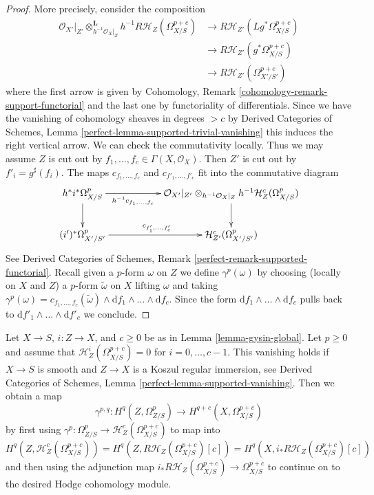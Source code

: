 \begin{proof}
More precisely, consider the composition
\begin{align*}
\mathcal{O}_{X'}|_{Z'} \otimes_{h^{-1}\mathcal{O}_X|_Z}^\mathbf{L}
h^{-1}R\mathcal{H}_Z(\Omega^{p + c}_{X/S})
& \to
R\mathcal{H}_{Z'}(Lg^*\Omega^{p + c}_{X/S}) \\
& \to
R\mathcal{H}_{Z'}(g^*\Omega^{p + c}_{X/S}) \\
& \to
R\mathcal{H}_{Z'}(\Omega^{p + c}_{X'/S'})
\end{align*}
where the first arrow is given by
Cohomology, Remark \ref{cohomology-remark-support-functorial}
and the last one by functoriality of differentials.
Since we have the vanishing of cohomology sheaves in degrees $> c$
by Derived Categories of Schemes, Lemma
\ref{perfect-lemma-supported-trivial-vanishing}
this induces the right vertical arrow.
We can check the commutativity locally.
Thus we may assume $Z$ is cut out by
$f_1, \ldots, f_c \in \Gamma(X, \mathcal{O}_X)$.
Then $Z'$ is cut out by $f'_i = g^\sharp(f_i)$.
The maps $c_{f_1, \ldots, f_c}$ and $c_{f'_1, \ldots, f'_c}$
fit into the commutative diagram
$$
\xymatrix{
h^*i^*\Omega^p_{X/S} \ar[rr]_-{h^{-1}c_{f_1, \ldots, f_c}} \ar[d] & &
\mathcal{O}_{X'}|_{Z'} \otimes_{h^{-1}\mathcal{O}_X|_Z}
h^{-1}\mathcal{H}^c_Z(\Omega^p_{X/S}) \ar[d] \\
(i')^*\Omega^p_{X'/S'} \ar[rr]^{c_{f'_1, \ldots, f'_c}} & &
\mathcal{H}^c_{Z'}(\Omega^p_{X'/S'})
}
$$
See Derived Categories of Schemes, Remark
\ref{perfect-remark-supported-functorial}.
Recall given a $p$-form $\omega$ on $Z$ we define
$\gamma^p(\omega)$ by choosing (locally on $X$ and $Z$)
a $p$-form $\tilde \omega$ on $X$ lifting $\omega$ and taking
$\gamma^p(\omega) =
c_{f_1, \ldots, f_c}(\tilde \omega) \wedge
\text{d}f_1 \wedge \ldots \wedge \text{d}f_c$.
Since the form $\text{d}f_1 \wedge \ldots \wedge \text{d}f_c$
pulls back to
$\text{d}f'_1 \wedge \ldots \wedge \text{d}f'_c$ we conclude.
\end{proof}

\begin{remark}
\label{remark-how-to-use}
Let $X \to S$, $i : Z \to X$, and $c \geq 0$ be as in
Lemma \ref{lemma-gysin-global}.
Let $p \geq 0$ and assume that $\mathcal{H}^i_Z(\Omega^{p + c}_{X/S}) = 0$
for $i = 0, \ldots, c - 1$. This vanishing holds if $X \to S$ is smooth
and $Z \to X$ is a Koszul regular immersion, see
Derived Categories of Schemes, Lemma \ref{perfect-lemma-supported-vanishing}.
Then we obtain a map
$$
\gamma^{p, q} :
H^q(Z, \Omega^p_{Z/S})
\longrightarrow
H^{q + c}(X, \Omega^{p + c}_{X/S})
$$
by first using
$\gamma^p : \Omega^p_{Z/S} \to \mathcal{H}^c_Z(\Omega^{p + c}_{X/S})$
to map into
$$
H^q(Z, \mathcal{H}^c_Z(\Omega^{p + c}_{X/S})) =
H^q(Z, R\mathcal{H}_Z(\Omega^{p + c}_{X/S})[c]) =
H^q(X, i_*R\mathcal{H}_Z(\Omega^{p + c}_{X/S})[c])
$$
and then using the adjunction map
$i_*R\mathcal{H}_Z(\Omega^{p + c}_{X/S}) \to \Omega^{p + c}_{X/S}$
to continue on to the desired Hodge cohomology module.
\end{remark}

